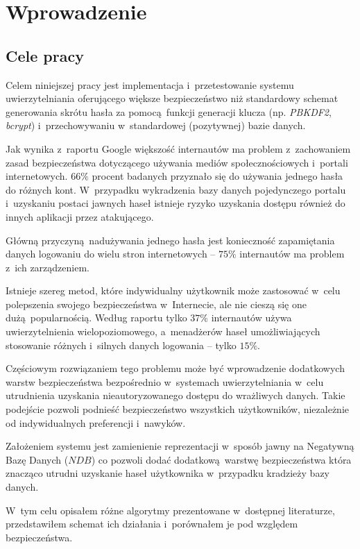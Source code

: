 \chapter{Wprowadzenie}
\section{Cele pracy}
Celem niniejszej pracy jest implementacja i~przetestowanie systemu uwierzytelniania oferującego większe bezpieczeństwo
niż standardowy schemat generowania skrótu hasła za pomocą funkcji generacji klucza (np. \textit{PBKDF2}, \textit{bcrypt})
i~przechowywaniu w~standardowej (pozytywnej) bazie danych.
    
Jak wynika z~raportu Google\cite{google-poll} większość internautów ma problem z~zachowaniem zasad bezpieczeństwa dotyczącego 
używania mediów społecznościowych i~portali internetowych. $66\%$ procent badanych przyznało się do używania jednego hasła do różnych kont. 
W~przypadku wykradzenia bazy danych pojedynczego portalu i~uzyskaniu postaci jawnych haseł istnieje ryzyko uzyskania dostępu również do innych aplikacji
przez atakującego.

Główną przyczyną nadużywania jednego hasła jest konieczność zapamiętania danych logowaniu do wielu stron internetowych -- $75\%$ internautów ma problem z~ich zarządzeniem.
  
Istnieje szereg metod, które indywidualny użytkownik może zastosować w~celu polepszenia swojego bezpieczeństwa w~Internecie, ale nie cieszą
się one dużą popularnością. Według raportu tylko $37\%$ internautów używa uwierzytelnienia wielopoziomowego, a~menadżerów haseł
umożliwiających stosowanie różnych i~silnych danych logowania -- tylko $15\%$.

Częściowym rozwiązaniem tego problemu może być wprowadzenie dodatkowych warstw bezpieczeństwa bezpośrednio w~systemach uwierzytelniania
w~celu utrudnienia uzyskania nieautoryzowanego dostępu do wrażliwych danych. Takie podejście pozwoli podnieść bezpieczeństwo wszystkich użytkowników,
niezależnie od indywidualnych preferencji i~nawyków.
 
Założeniem systemu jest zamienienie reprezentacji w~sposób jawny na Negatywną Bazę Danych ($NDB$) co pozwoli dodać 
dodatkową warstwę bezpieczeństwa która znacząco utrudni uzyskanie haseł użytkownika w~przypadku kradzieży bazy danych.

W~tym celu opisałem różne algorytmy prezentowane w~dostępnej literaturze, przedstawiłem schemat ich działania i~porównałem
je pod względem bezpieczeństwa. 

